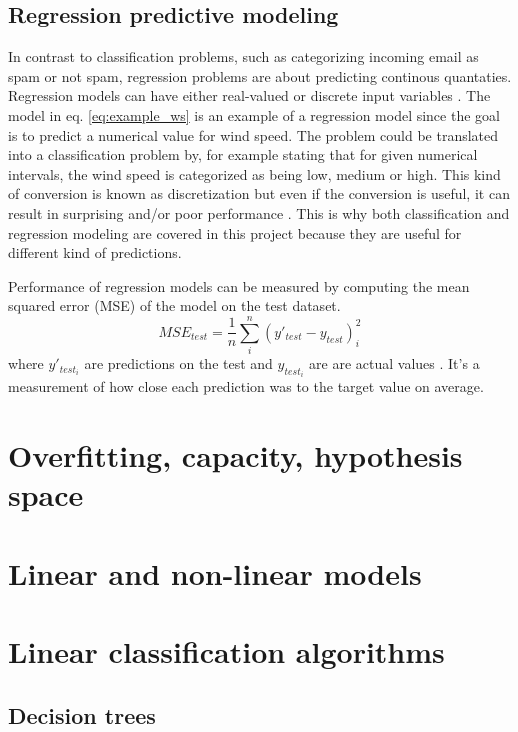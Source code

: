 	\subsection{Regression predictive modeling}
	In contrast to classification problems, such as categorizing incoming email as spam or not spam, regression problems are about predicting continous quantaties. Regression models can have either real-valued or discrete input variables \cite{WEBSITE:8}. The model in eq. \ref{eq:example_ws} is an example of a regression model since the goal is to predict a numerical value for wind speed. The problem could be translated into a classification problem by, for example stating that for given numerical intervals, the wind speed is categorized as being low, medium or high. This kind of conversion is known as discretization but even if the conversion is useful, it can result in surprising and/or poor performance \cite{WEBSITE:8}. This is why both classification and regression modeling are covered in this project because they are useful for different kind of predictions.

Performance of regression models can be measured by computing the mean squared error (MSE) of the model on the test dataset. 
\begin{equation}
	MSE_{test} = \frac{1}{n} \sum_{i}^{n}(y'_{test} - y_{test})_{i}^2
\end{equation}
 where $y'_{test_i}$ are predictions on the test and $y_{test_i}$ are are actual values \cite{BOOK:1}. It's a measurement of how close each prediction was to the target value on average.

\section{Overfitting, capacity, hypothesis space}

\section{Linear and non-linear models}

\section{Linear classification algorithms}
	\subsection{Decision trees}

